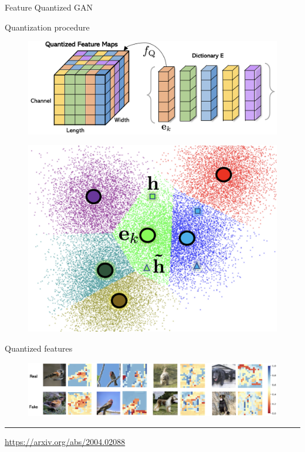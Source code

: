 \begin{frame}{Feature Quantized GAN}
	\begin{block}{Quantization procedure}
		\begin{minipage}[t]{0.65\columnwidth}
			\begin{figure}
				\centering
				\includegraphics[width=\linewidth]{figs/fqgan_cnn.png}
			\end{figure}
		\end{minipage}%
		\begin{minipage}[t]{0.35\columnwidth}
			\begin{figure}
				\centering
				\includegraphics[width=0.9\linewidth]{figs/fqgan_lookup}
			\end{figure}
		\end{minipage}
	\end{block}
	\begin{block}{Quantized features}
		\begin{figure}
			\centering
			\includegraphics[width=\linewidth]{figs/fqgan_features}
		\end{figure}
	\end{block}
	\vfill
	\hrule\medskip
	{\scriptsize \href{https://arxiv.org/abs/2004.02088}{https://arxiv.org/abs/2004.02088}} 
\end{frame}
